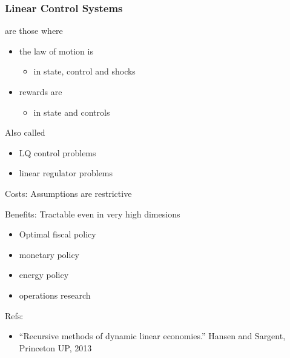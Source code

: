 \begin{frame}
    \frametitle{Linear Control Systems}

     are those where

    \begin{itemize}
        \item the law of motion is 
            \begin{itemize}
                \item in state, control and shocks
            \end{itemize}
        \vspace{0.5em}
        \item rewards are  
            \begin{itemize}
                \item in state and controls
            \end{itemize}
    \end{itemize}
    
    Also called
    \begin{itemize}
        \item LQ control problems
        \item linear regulator problems
    \end{itemize}
    

\end{frame}


\begin{frame}
    
    Costs: Assumptions are restrictive 
    
    Benefits: Tractable even in very high dimesions

        \vspace{0.5em}
    \Egs
    \begin{itemize}
        \item Optimal fiscal policy
        \item monetary policy
        \item energy policy
        \item operations research 
    \end{itemize}

        \vspace{0.5em}
    Refs:
    \begin{itemize}
        \item ``Recursive methods of dynamic linear economies.'' Hansen and
            Sargent, Princeton UP, 2013
    \end{itemize}


\end{frame}




